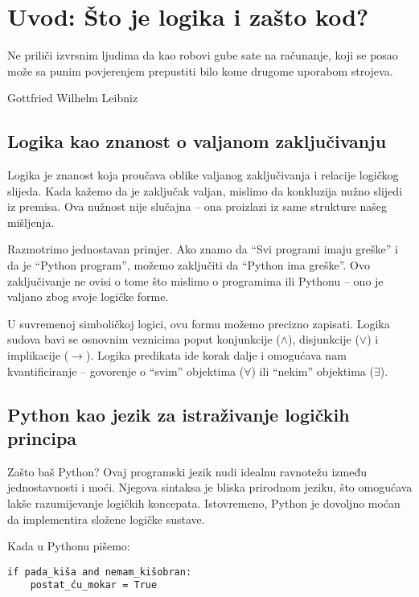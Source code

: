 
\chapter{Uvod: Što je logika i zašto kod?}

\epigraph{Ne priliči izvrsnim ljudima da kao robovi gube sate na računanje, koji se posao može sa punim povjerenjem prepustiti bilo kome drugome uporabom strojeva.}{Gottfried Wilhelm Leibniz\footnotemark}

\section*{Logika kao znanost o valjanom zaključivanju}

Logika je znanost koja proučava oblike valjanog zaključivanja i relacije logičkog slijeda. Kada kažemo da je zaključak valjan, mislimo da konkluzija nužno slijedi iz premisa. Ova nužnost nije slučajna – ona proizlazi iz same strukture našeg mišljenja.

Razmotrimo jednostavan primjer. Ako znamo da ``Svi programi imaju greške'' i da je ``Python program'', možemo zaključiti da ``Python ima greške''. Ovo zaključivanje ne ovisi o tome što mislimo o programima ili Pythonu -- ono je valjano zbog svoje logičke forme.

U suvremenoj simboličkoj logici, ovu formu možemo precizno zapisati. Logika sudova bavi se osnovnim veznicima poput konjunkcije ($\wedge$), disjunkcije ($\vee$) i implikacije ($\rightarrow$). Logika predikata ide korak dalje i omogućava nam kvantificiranje -- govorenje o ``svim'' objektima ($\forall$) ili ``nekim'' objektima ($\exists$).

\section*{Python kao jezik za istraživanje logičkih principa}

Zašto baš Python? Ovaj programski jezik nudi idealnu ravnotežu između jednostavnosti i moći. Njegova sintaksa je bliska prirodnom jeziku, što omogućava lakše razumijevanje logičkih koncepata. Istovremeno, Python je dovoljno moćan da implementira složene logičke sustave.

Kada u Pythonu pišemo:
\begin{verbatim}
if pada_kiša and nemam_kišobran:
    postat_ću_mokar = True
\end{verbatim}

